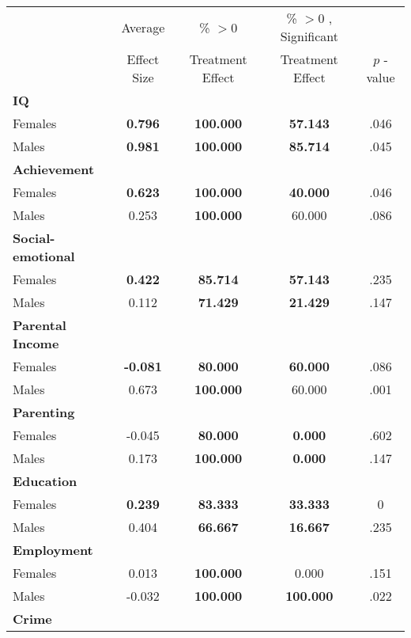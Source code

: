 \begin{tabular}{l c c c c}
\toprule
 & Average & \% $ >0 $ & \% $ >0 $ , Significant & \citet{Rosenbaum_2005_Distribution_JRSS} \\
 & Effect Size & Treatment Effect & Treatment Effect & $ p $ -value \\
\midrule
\textbf{IQ} & & & & \\
\quad Females &  \textbf{    0.796} & \textbf{  100.000} & \textbf{   57.143} & .046 \\
\quad Males &  \textbf{    0.981} & \textbf{  100.000} & \textbf{   85.714} & .045 \\
\midrule
\textbf{Achievement} & & & & \\
\quad Females &  \textbf{    0.623} & \textbf{  100.000} & \textbf{   40.000} & .046 \\
\quad Males &      0.253 & \textbf{  100.000} &    60.000 & .086 \\
\midrule
\textbf{Social-emotional} & & & & \\
\quad Females &  \textbf{    0.422} & \textbf{   85.714} & \textbf{   57.143} & .235 \\
\quad Males &      0.112 & \textbf{   71.429} & \textbf{   21.429} & .147 \\
\midrule
\textbf{Parental Income} & & & & \\
\quad Females &  \textbf{   -0.081} & \textbf{   80.000} & \textbf{   60.000} & .086 \\
\quad Males &      0.673 & \textbf{  100.000} &    60.000 & .001 \\
\midrule
\textbf{Parenting} & & & & \\
\quad Females &     -0.045 & \textbf{   80.000} & \textbf{    0.000} & .602 \\
\quad Males &      0.173 & \textbf{  100.000} & \textbf{    0.000} & .147 \\
\midrule
\textbf{Education} & & & & \\
\quad Females &  \textbf{    0.239} & \textbf{   83.333} & \textbf{   33.333} & 0 \\
\quad Males &      0.404 & \textbf{   66.667} & \textbf{   16.667} & .235 \\
\midrule
\textbf{Employment} & & & & \\
\quad Females &      0.013 & \textbf{  100.000} &     0.000 & .151 \\
\quad Males &     -0.032 & \textbf{  100.000} & \textbf{  100.000} & .022 \\
\midrule
\textbf{Crime} & & & & \\

\end{tabular}
